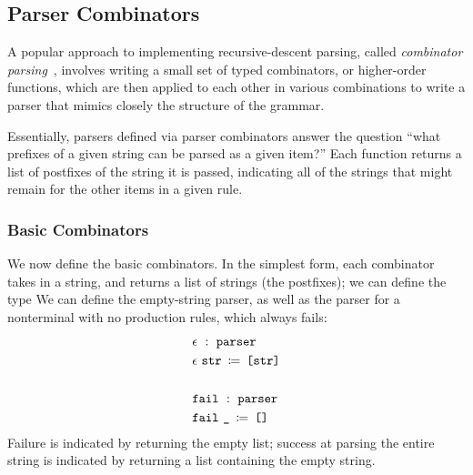     \subsection{Parser Combinators}
      A popular approach to implementing recursive-descent parsing, called \emph{combinator parsing}~\cite{pcomb}, involves writing a small set of typed combinators, or higher-order functions, which are then applied to each other in various combinations to write a parser that mimics closely the structure of the grammar.
      
      Essentially, parsers defined via parser combinators answer the question ``what prefixes of a given string can be parsed as a given item?''  Each function returns a list of postfixes of the string it is passed, indicating all of the strings that might remain for the other items in a given rule.
      
    \subsubsection{Basic Combinators}
      We now define the basic combinators.  In the simplest form, each combinator takes in a string, and returns a list of strings (the postfixes); we can define the type
     We can define the empty-string parser, as well as the parser for a nonterminal with no production rules, which always fails:
\begin{align*}
&\epsilon~:~\texttt{parser}\\
&\epsilon~\texttt{str} ~\operatorname{\texttt{\ensuremath{\coloneqq}}}~ \texttt{[}\texttt{str}\texttt{]} \\ \\
&\texttt{fail}~:~\texttt{parser}\\
&\texttt{fail}~\texttt{\_} ~\operatorname{\texttt{\ensuremath{\coloneqq}}}~ \texttt{[]}
\end{align*}
      Failure is indicated by returning the empty list; success at parsing the entire string is indicated by returning a list containing the empty string.
      
